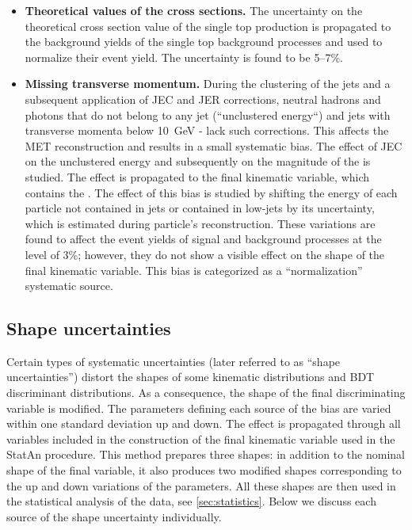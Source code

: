 \begin{itemize}
\item{\bf Theoretical values of the cross sections.} 
The uncertainty on the theoretical cross section value of the single top production is propagated to the background yields of the single top background processes and used to normalize their event yield. The uncertainty is found to be 5--7\%. 

\item{\bf Missing transverse momentum.} 
During the clustering of the jets and a subsequent application of JEC and JER corrections, 
neutral hadrons and photons that do not belong to any jet (``unclustered energy``) and jets with transverse momenta below 10~GeV - lack such corrections. This affects the MET reconstruction and results in a small systematic bias. The effect of JEC on the unclustered energy and subsequently on the magnitude of the \PTslash is studied. The effect is propagated to the final kinematic variable, which contains the \PTslash. The effect of this bias is studied by shifting the energy of each particle not contained in jets or contained in low-\pt jets by its uncertainty, which is estimated during particle's reconstruction. These variations are found to affect the event yields of signal and background processes at the level of 3\%; however, they do not show a visible effect on the shape of the final kinematic variable. This bias is categorized as a ``normalization'' systematic source.

\end{itemize}

\subsection{Shape uncertainties}
\label{sec:shapes}

Certain types of systematic uncertainties (later referred to as ``shape uncertainties'') distort the shapes of some 
kinematic distributions and BDT discriminant distributions. As a consequence, the shape of the final discriminating variable is modified. The parameters defining each source of the bias are varied within one standard deviation up and down. The effect is propagated through all variables included in the construction of the final kinematic variable used in the StatAn procedure. This method prepares three shapes: in addition to the nominal shape of the final variable, it also produces two modified shapes corresponding to the up and down variations of the parameters. All these shapes are then used in the statistical analysis of the data, see \ref{sec:statistics}. Below we discuss each source of the shape uncertainty individually.

